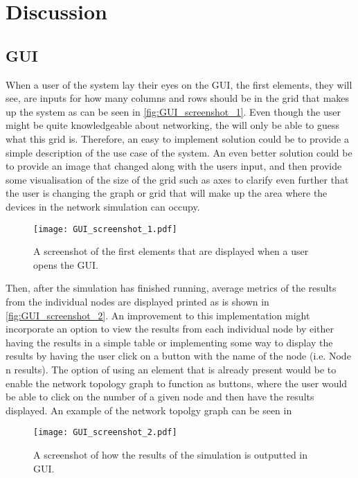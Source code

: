 \chapter{Discussion}\label{ch:Discussion}


\section{GUI}
When a user of the system lay their eyes on the GUI, the first elements, they will see, are inputs for how many columns and rows should be in the grid that makes up the system as can be seen in \autoref{fig:GUI_screenshot_1}. Even though the user might be quite knowledgeable about networking, the will only be able to guess what this grid is. Therefore, an easy to implement solution could be to provide a simple description of the use case of the system. An even better solution could be to provide an image that changed along with the users input, and then provide some visualisation of the size of the grid such as axes to clarify even further that the user is changing the graph or grid that will make up the area where the devices in the network simulation can occupy.

\begin{figure}[H]
  \centering
  \texttt{[image: GUI\_screenshot\_1.pdf]}
  \caption{A screenshot of the first elements that are displayed when a user opens the GUI.}
  \label{fig:GUI_screenshot_1}
\end{figure}

Then, after the simulation has finished running, average metrics of the results from the individual nodes are displayed printed as is shown in \autoref{fig:GUI_screenshot_2}. An improvement to this implementation might incorporate an option to view the results from each individual node by either having the results in a simple table or implementing some way to display the results by having the user click on a button with the name of the node (i.e. Node n results). The option of using an element that is already present would be to enable the network topology graph to function as buttons, where the user would be able to click on the number of a given node and then have the results displayed. An example of the network topolgy graph can be seen in 

\begin{figure}[H]
  \centering
  \texttt{[image: GUI\_screenshot\_2.pdf]}
  \caption{A screenshot of how the results of the simulation is outputted in GUI.}
  \label{fig:GUI_screenshot_2}
\end{figure}




